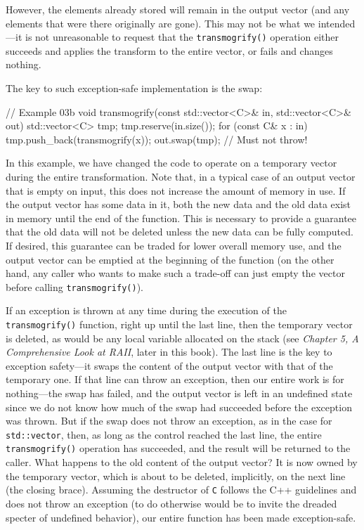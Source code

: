 However, the elements already stored will remain in the output vector (and any elements that were there originally are gone). This may not be what we intended---it is not unreasonable to request that the \texttt{transmogrify()} operation either succeeds and applies the transform to the entire vector, or fails and changes nothing.

The key to such exception-safe implementation is the swap:

\begin{code}
// Example 03b
void transmogrify(const std::vector<C>& in,
                  std::vector<C>& out) {
  std::vector<C> tmp;
  tmp.reserve(in.size());
  for (const C& x : in) {
    tmp.push_back(transmogrify(x));
  }
  out.swap(tmp);    // Must not throw!
}
\end{code}

In this example, we have changed the code to operate on a temporary vector during the entire transformation. Note that, in a typical case of an output vector that is empty on input, this does not increase the amount of memory in use. If the output vector has some data in it, both the new data and the old data exist in memory until the end of the function. This is necessary to provide a guarantee that the old data will not be deleted unless the new data can be fully computed. If desired, this guarantee can be traded for lower overall memory use, and the output vector can be emptied at the beginning of the function (on the other hand, any caller who wants to make such a trade-off can just empty the vector before calling \texttt{transmogrify()}).

If an exception is thrown at any time during the execution of the \texttt{transmogrify()} function, right up until the last line, then the temporary vector is deleted, as would be any local variable allocated on the stack (see \emph{Chapter 5, A Comprehensive Look at RAII}, later in this book). The last line is the key to exception safety---it swaps the content of the output vector with that of the temporary one. If that line can throw an exception, then our entire work is for nothing---the swap has failed, and the output vector is left in an undefined state since we do not know how much of the swap had succeeded before the exception was thrown. But if the swap does not throw an exception, as in the case for \texttt{std::vector}, then, as long as the control reached the last line, the entire \texttt{transmogrify()} operation has succeeded, and the result will be returned to the caller. What happens to the old content of the output vector? It is now owned by the temporary vector, which is about to be deleted, implicitly, on the next line (the closing brace). Assuming the destructor of \texttt{C} follows the C++ guidelines and does not throw an exception (to do otherwise would be to invite the dreaded specter of undefined behavior), our entire function has been made exception-safe.


